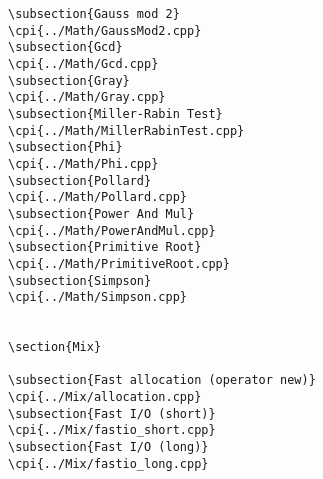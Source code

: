 {\begin{verbatim}
\subsection{Gauss mod 2}
\cpi{../Math/GaussMod2.cpp}
\subsection{Gcd}
\cpi{../Math/Gcd.cpp}
\subsection{Gray}
\cpi{../Math/Gray.cpp}
\subsection{Miller-Rabin Test}
\cpi{../Math/MillerRabinTest.cpp}
\subsection{Phi}
\cpi{../Math/Phi.cpp}
\subsection{Pollard}
\cpi{../Math/Pollard.cpp}
\subsection{Power And Mul}
\cpi{../Math/PowerAndMul.cpp}
\subsection{Primitive Root}
\cpi{../Math/PrimitiveRoot.cpp}
\subsection{Simpson}
\cpi{../Math/Simpson.cpp}


\section{Mix}

\subsection{Fast allocation (operator new)}
\cpi{../Mix/allocation.cpp}
\subsection{Fast I/O (short)}
\cpi{../Mix/fastio_short.cpp}
\subsection{Fast I/O (long)}
\cpi{../Mix/fastio_long.cpp}

\end{verbatim}}
